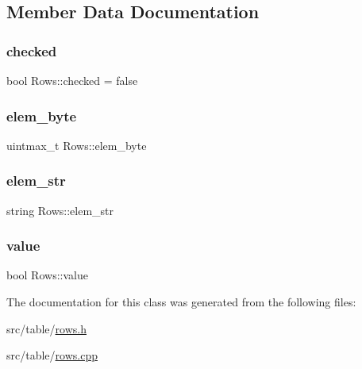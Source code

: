 \subsection{Member Data Documentation}
\mbox{\label{class_rows_acf35a12cc4ce4e4b0c61af3757321803}} 
\subsubsection{\texorpdfstring{checked}{checked}}
{\footnotesize\ttfamily bool Rows\+::checked = false}

\mbox{\label{class_rows_ac2cf1184df80a0fdab7da08e13c050ba}} 
\subsubsection{\texorpdfstring{elem\+\_\+byte}{elem\_byte}}
{\footnotesize\ttfamily uintmax\+\_\+t Rows\+::elem\+\_\+byte\hspace{0.3cm}{\ttfamily [private]}}

\mbox{\label{class_rows_a0bae45d3eb178a0b8fe253a9c447bbc1}} 
\subsubsection{\texorpdfstring{elem\+\_\+str}{elem\_str}}
{\footnotesize\ttfamily string Rows\+::elem\+\_\+str}

\mbox{\label{class_rows_a2b3d2fabf2107acdce437f8896a9d999}} 
\subsubsection{\texorpdfstring{value}{value}}
{\footnotesize\ttfamily bool Rows\+::value\hspace{0.3cm}{\ttfamily [private]}}



The documentation for this class was generated from the following files\+:\begin{DoxyCompactItemize}
\item 
src/table/\hyperlink{rows_8h}{rows.\+h}\item 
src/table/\hyperlink{rows_8cpp}{rows.\+cpp}\end{DoxyCompactItemize}
